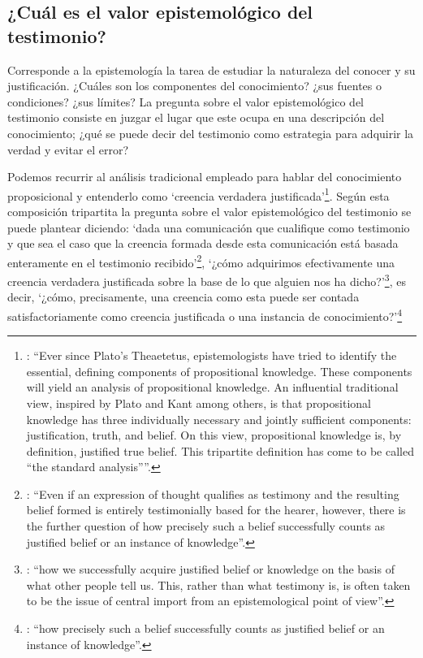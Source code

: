 \subsection{¿Cuál es el valor epistemológico del testimonio?}

Corresponde a la epistemología la tarea de estudiar la naturaleza del conocer y su justificación. ¿Cuáles son los componentes del conocimiento? ¿sus fuentes o condiciones? ¿sus límites? La pregunta sobre el valor epistemológico del testimonio consiste en juzgar el lugar que este ocupa en una descripción del conocimiento; ¿qué se puede decir del testimonio como estrategia para adquirir la verdad y evitar el error?

Podemos recurrir al análisis tradicional empleado para hablar del conocimiento proposicional y entenderlo como \enquote*{creencia verdadera justificada}\footnote{\Cite[4]{moser2002ep}: \enquote{Ever since Plato's Theaetetus, epistemologists have tried to identify the essential, defining components of propositional knowledge. These components will yield an analysis of propositional knowledge. An influential traditional view, inspired by Plato and Kant among others, is that propositional knowledge has three individually necessary and jointly sufficient components: justification, truth, and belief. On this view, propositional knowledge is, by definition, justified true belief. This tripartite definition has come to be called ``the standard analysis''}.}. Según esta composición tripartita la pregunta sobre el valor epistemológico del testimonio se puede plantear diciendo: \enquote*{dada una comunicación que cualifique como testimonio y que sea el caso que la creencia formada desde esta comunicación está basada enteramente en el testimonio recibido}\footnote{\cite[Cf.][4]{lackeysosa2006eptest}: \enquote{Even if an expression of thought qualifies as testimony and the resulting belief formed is entirely testimonially based for the hearer, however, there is the further question of how precisely such a belief successfully counts as justified belief or an instance of knowledge}.}, \enquote*{¿cómo adquirimos efectivamente una creencia verdadera justificada sobre la base de lo que alguien nos ha dicho?}\footnote{\cite[Cf.][2]{lackeysosa2006eptest}: \enquote{how we successfully acquire justified belief or knowledge on the basis of what other people tell us. This, rather than what testimony is, is often taken to be the issue of central import from an epistemological point of view}.}, es decir, \enquote*{¿cómo, precisamente, una creencia como esta puede ser contada satisfactoriamente como creencia justificada o una instancia de conocimiento?}\footnote{\cite[Cf.][4]{lackeysosa2006eptest}: \enquote{how precisely such a belief successfully counts as justified belief or an instance of knowledge}.}

